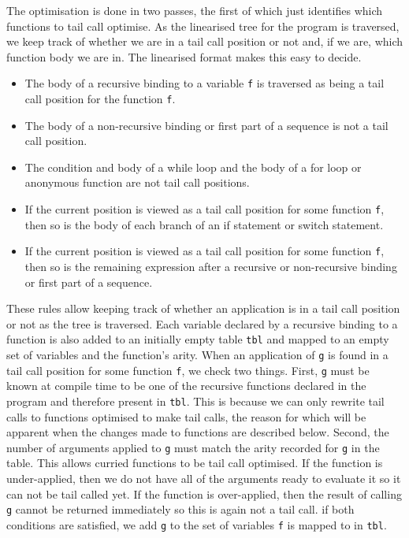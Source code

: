 The optimisation is done in two passes, the first of which just identifies which functions to tail call optimise. As the linearised tree for the program is traversed, we keep track of whether we are in a tail call position or not and, if we are, which function body we are in. The linearised format makes this easy to decide. \\
\begin{itemize} %
\item The body of a recursive binding to a variable \verb|f| is traversed as being a tail call position for the function \verb|f|.
\item The body of a non-recursive binding or first part of a sequence is not a tail call position.
\item The condition and body of a while loop and the body of a for loop or anonymous function are not tail call positions.
\item If the current position is viewed as a tail call position for some function \verb|f|, then so is the body of each branch of an if statement or switch statement.
\item If the current position is viewed as a tail call position for some function \verb|f|, then so is the remaining expression after a recursive or non-recursive binding or first part of a sequence.
\end{itemize}
These rules allow keeping track of whether an application is in a tail call position or not as the tree is traversed. Each variable declared by a recursive binding to a function is also added to an initially empty table \verb|tbl| and mapped to an empty set of variables and the function's arity. When an application of \verb|g| is found in a tail call position for some function \verb|f|, we check two things. First, \verb|g| must be known at compile time to be one of the recursive functions declared in the program and therefore present in \verb|tbl|. 
This is because we can only rewrite tail calls to functions optimised to make tail calls, the reason for which will be apparent when the changes made to functions are described below.
Second, the number of arguments applied to \verb|g| must match the arity recorded for \verb|g| in the table. This allows curried functions to be tail call optimised. If the function is under-applied, then we do not have all of the arguments ready to evaluate it so it can not be tail called yet. If the function is over-applied, then the result of calling \verb|g| cannot be returned immediately so this is again not a tail call. if both conditions are satisfied, we add \verb|g| to the set of variables \verb|f| is mapped to in \verb|tbl|.

